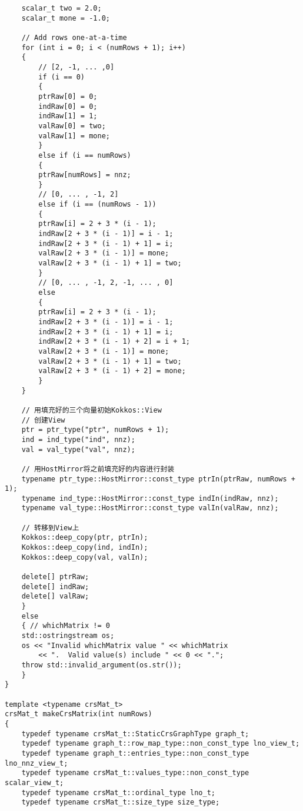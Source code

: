 \begin{lstlisting}
    scalar_t two = 2.0;
    scalar_t mone = -1.0;

    // Add rows one-at-a-time
    for (int i = 0; i < (numRows + 1); i++)
    {
        // [2, -1, ... ,0]
        if (i == 0)
        {
        ptrRaw[0] = 0;
        indRaw[0] = 0;
        indRaw[1] = 1;
        valRaw[0] = two;
        valRaw[1] = mone;
        }
        else if (i == numRows)
        {
        ptrRaw[numRows] = nnz;
        }
        // [0, ... , -1, 2]
        else if (i == (numRows - 1))
        {
        ptrRaw[i] = 2 + 3 * (i - 1);
        indRaw[2 + 3 * (i - 1)] = i - 1;
        indRaw[2 + 3 * (i - 1) + 1] = i;
        valRaw[2 + 3 * (i - 1)] = mone;
        valRaw[2 + 3 * (i - 1) + 1] = two;
        }
        // [0, ... , -1, 2, -1, ... , 0]
        else
        {
        ptrRaw[i] = 2 + 3 * (i - 1);
        indRaw[2 + 3 * (i - 1)] = i - 1;
        indRaw[2 + 3 * (i - 1) + 1] = i;
        indRaw[2 + 3 * (i - 1) + 2] = i + 1;
        valRaw[2 + 3 * (i - 1)] = mone;
        valRaw[2 + 3 * (i - 1) + 1] = two;
        valRaw[2 + 3 * (i - 1) + 2] = mone;
        }
    }

    // 用填充好的三个向量初始Kokkos::View
    // 创建View
    ptr = ptr_type("ptr", numRows + 1);
    ind = ind_type("ind", nnz);
    val = val_type("val", nnz);

    // 用HostMirror将之前填充好的内容进行封装
    typename ptr_type::HostMirror::const_type ptrIn(ptrRaw, numRows + 1);
    typename ind_type::HostMirror::const_type indIn(indRaw, nnz);
    typename val_type::HostMirror::const_type valIn(valRaw, nnz);

    // 转移到View上
    Kokkos::deep_copy(ptr, ptrIn);
    Kokkos::deep_copy(ind, indIn);
    Kokkos::deep_copy(val, valIn);

    delete[] ptrRaw;
    delete[] indRaw;
    delete[] valRaw;
    }
    else
    { // whichMatrix != 0
    std::ostringstream os;
    os << "Invalid whichMatrix value " << whichMatrix
        << ".  Valid value(s) include " << 0 << ".";
    throw std::invalid_argument(os.str());
    }
}

template <typename crsMat_t>
crsMat_t makeCrsMatrix(int numRows)
{
    typedef typename crsMat_t::StaticCrsGraphType graph_t;
    typedef typename graph_t::row_map_type::non_const_type lno_view_t;
    typedef typename graph_t::entries_type::non_const_type lno_nnz_view_t;
    typedef typename crsMat_t::values_type::non_const_type scalar_view_t;
    typedef typename crsMat_t::ordinal_type lno_t;
    typedef typename crsMat_t::size_type size_type;


\end{lstlisting}

